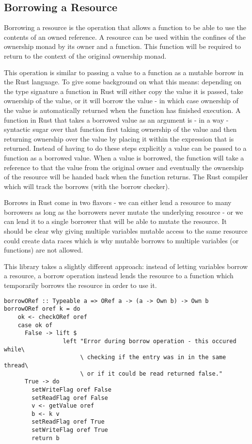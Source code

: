 \documentclass[onehalf,11pt]{beavtex}
\begin{document}
\subsection{Borrowing a Resource}

Borrowing a resource is the operation that allows a function to be able to use
the contents of an owned reference.
A resource can be used within the confines of the ownership monad by its owner
and a function. This function will be required to return to the
context of the original ownership monad.

This operation is similar to passing a value to a function as a mutable
borrow in the Rust language.
To give some background on what this means:
depending on the type signature a function in Rust will either copy the value
it is passed, take ownership of the value, or it will borrow the value - in
which case ownership of the value is automatically returned when the function
has finished execution.\cite{rust_book_ownership}
A function in Rust that takes a borrowed value as an argument is - in a way -
syntactic sugar over that function first taking ownership of the value and then
returning ownership over the value by placing it within the expression that is
returned.
Instead of having to do these steps explicitly a value can be passed to a
function as a borrowed value.  When a value is borrowed, the function will take
a reference to that the value from the original owner and eventually the
ownership of the resource will be handed back when the function returns.
The Rust compiler which will track the borrows (with the borrow checker).

Borrows in Rust come in two flavors - we can either lend a resource to many
borrowers as long as the borrowers never mutate the underlying resource - or we
can lend it to a single borrower that will be able to mutate the
resource.\cite{rust_book_borrowing}
It should be clear why giving multiple variables mutable access to
the same resource could create data races which is why mutable borrows to
multiple variables (or functions) are not allowed.

This library takes a slightly different approach: instead of letting variables
borrow a resource, a borrow operation instead lends the resource to a function
which temporarily borrows the resource in order to use it.

\begin{verbatim}
borrowORef :: Typeable a => ORef a -> (a -> Own b) -> Own b
borrowORef oref k = do
    ok <- checkORef oref
    case ok of
      False -> lift $
                 left "Error during borrow operation - this occured while\
                      \ checking if the entry was in in the same thread\
                      \ or if it could be read returned false."
      True -> do
        setWriteFlag oref False
        setReadFlag oref False
        v <- getValue oref
        b <- k v
        setReadFlag oref True
        setWriteFlag oref True
        return b
\end{verbatim}
\end{document}
